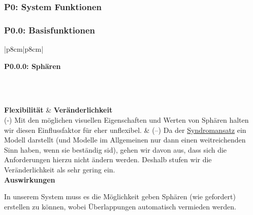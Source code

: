 \documentclass[enabledeprecatedfontcommands,fontsize=11pt,paper=a4,twoside]{scrartcl}
\newcounter{one}
\newcounter{two}[one]
\newcounter{three}[two]
\newcommand{\tone}{0\theone}
\newcommand{\ttwo}{0\thetwo}
\newcommand{\one}{\stepcounter{one}0\theone}
\newcommand{\two}{\stepcounter{two}0\thetwo}
\newcommand{\three}{\stepcounter{three}0\thethree}
\begin{document}
\subsubsection*{\hypertarget{l}{P\one}: System Funktionen}
\subsubsection*{\hypertarget{m}{P\tone.\two}: Basisfunktionen} 
\begin{tabular} {|p{8cm}|p{8cm}|}
	\hline
	 {\parbox{16cm}{\textbf{\hypertarget{n}{P\tone.\ttwo.\three}: Sphären}} } \\ \hline\hline 
	\rule{0pt}{4ex}\\ [2ex] \hline
	\textbf{Flexibilität}  & \textbf{Veränderlichkeit} \\
	(-) Mit den möglichen visuellen Eigenschaften und Werten von Sphären halten wir diesen Einflussfaktor für eher unflexibel. & 
	(–) Da der \hyperlink{Syndromansatz}{Syndromansatz} ein Modell darstellt (und Modelle im Allgemeinen nur dann einen weitreichenden Sinn haben, wenn sie beständig sid), gehen wir davon aus, dass sich die Anforderungen hierzu nicht ändern werden. Deshalb stufen wir die Veränderlichkeit als sehr gering ein.\\
	\hline
	 {\textbf{Auswirkungen}} \\
	 {\parbox{16cm}{In unserem System muss es die Möglichkeit geben Sphären (wie gefordert) erstellen zu können, wobei Überlappungen automatisch vermieden werden.} }\\ \hline
\end{tabular}
\\ \\ \\ \\%
\end{document}
